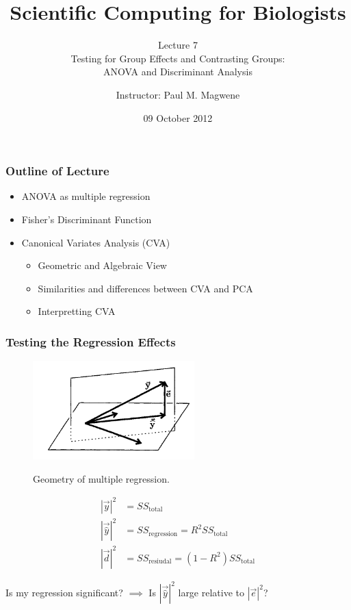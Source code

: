 \documentclass{beamer}
\title{Scientific Computing for Biologists}
\subtitle{Lecture 7 \\
        Testing for Group Effects and Contrasting Groups:\\ 
         ANOVA and Discriminant Analysis}
\author{Instructor: Paul M. Magwene}
\date{09 October 2012}
\begin{document}
\begin{frame}
\titlepage
\end{frame}


\begin{frame}
  \frametitle{Outline of Lecture}

\begin{itemize}
    \item ANOVA as multiple regression
    \item Fisher's Discriminant Function    
    \item Canonical Variates Analysis (CVA)
    \begin{itemize}
        \item Geometric and Algebraic View
        \item Similarities and differences between CVA and PCA
        \item Interpretting CVA
    \end{itemize}    

\end{itemize}

\end{frame}



\begin{frame}[fragile]
  \frametitle{Testing the Regression Effects}
  
\begin{figure}
{\centering \includegraphics[height=1.5in]{fig-multireg.pdf}}
\caption{Geometry of multiple regression.}
\end{figure}
%
\begin{align*}
|\vec{y}|^2 &= SS_{\text{total}} \\
|\vec{\hat{y}}|^2 &= SS_{\text{regression}} = R^2 SS_{\text{total}}\\
|\vec{d}|^2 &= SS_{\text{resiudal}}  = (1-R^2)SS_{\text{total}}
\end{align*}
%
\begin{center}
\alert{Is my regression significant? $\implies$ Is $|\vec{\hat{y}}|^2$ large relative to $|\vec{e}|^2$?}
\end{center}

\end{frame}
\end{document}
